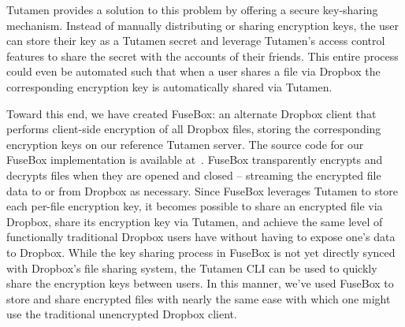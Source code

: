 Tutamen provides a solution to this problem by offering a secure
key-sharing mechanism. Instead of manually distributing or sharing
encryption keys, the user can store their key as a Tutamen secret and
leverage Tutamen's access control features to share the secret with
the accounts of their friends. This entire process could even be
automated such that when a user shares a file via Dropbox the
corresponding encryption key is automatically shared via Tutamen.

Toward this end, we have created FuseBox: an alternate Dropbox client
that performs client-side encryption of all Dropbox files, storing the
corresponding encryption keys on our reference Tutamen server. The
source code for our FuseBox implementation is available
at~\cite{fusebox}.  FuseBox transparently encrypts and decrypts files
when they are opened and closed -- streaming the encrypted file data
to or from Dropbox as necessary. Since FuseBox leverages Tutamen to
store each per-file encryption key, it becomes possible to share an
encrypted file via Dropbox, share its encryption key via Tutamen, and
achieve the same level of functionally traditional Dropbox users have
without having to expose one's data to Dropbox. While the key sharing
process in FuseBox is not yet directly synced with Dropbox's file
sharing system, the Tutamen CLI can be used to quickly share the
encryption keys between users. In this manner, we've used FuseBox to
store and share encrypted files with nearly the same ease with which
one might use the traditional unencrypted Dropbox client.

